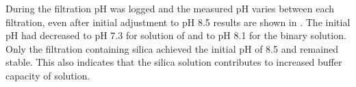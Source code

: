 
During the filtration pH was logged and the measured pH varies between each filtration, even after initial adjustment to pH 8.5 results are shown in . 
The initial pH had decreased to pH 7.3 for solution of  and to pH 8.1 for the  binary solution.
Only the filtration containing silica achieved the initial pH of 8.5 and remained stable. 
This also indicates that the silica solution contributes to increased buffer capacity of solution. \citep{WaterChemistry1980} 











